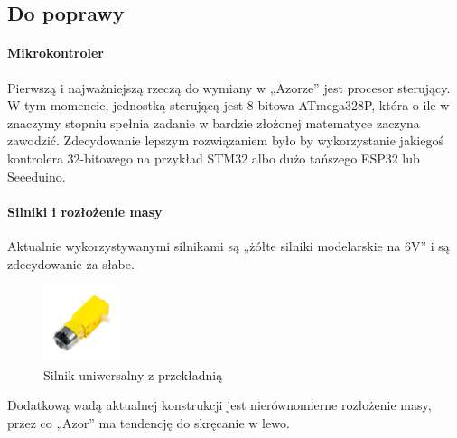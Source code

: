     \newpage
    \subsection{Do poprawy}
        \paragraph{Mikrokontroler\\}
        Pierwszą i najważniejszą rzeczą do wymiany w „Azorze” jest procesor sterujący.
        W tym momencie, jednostką sterującą jest 8-bitowa ATmega328P, która o ile w znaczymy stopniu spełnia zadanie w bardzie złożonej matematyce zaczyna zawodzić.
        Zdecydowanie lepszym rozwiązaniem było by wykorzystanie jakiegoś kontrolera 32-bitowego na przykład STM32 albo dużo tańszego ESP32 lub Seeeduino.

        \paragraph{Silniki i rozłożenie masy\\}
        Aktualnie wykorzystywanymi silnikami są „żółte silniki modelarskie na 6V” i są zdecydowanie za słabe.
        \begin{figure}[!h]
            \centering
            \includegraphics[width = 0.2\textwidth]{Img/silnik.jpg}
            \caption{Silnik uniwersalny z przekładnią}
        \end{figure}
        
        Dodatkową wadą aktualnej konstrukcji jest nierównomierne rozłożenie masy, przez co „Azor” ma tendencję do skręcanie w lewo.